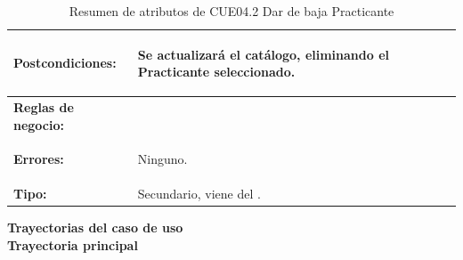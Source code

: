 \begin{table}[H]
\begin{tabular}{| l | p{12 cm} |}
\hline
\textbf{Postcondiciones:} & \vspace{-2mm}	%
							\begin{compactitem}
								\item Se actualizará el catálogo, eliminando el Practicante seleccionado.
							\end{compactitem}\\
\hline
\textbf{Reglas de negocio:} & \vspace{-2mm}	%
							\begin{compactitem}
								\item \nameref{rn:RNR23}
							\end{compactitem}\\							
\hline
\textbf{Errores:} &	\vspace{-2mm}	%
					\begin{compactitem}
						\setlength\itemsep{-0.25em}
						\item Ninguno.
					\end{compactitem}\\
\hline
\textbf{Tipo:} & Secundario, viene del \nameref{cu:CUE04}.\\
\hline	
\end{tabular}
\caption{Resumen de atributos de CUE04.2 Dar de baja Practicante}
\label{tab:CUE04.2}
\end{table} 

\textbf{\textcolor[rgb]{0, 0, 0.545098}{Trayectorias del caso de uso}} \\

\textbf{\large{Trayectoria principal}}

